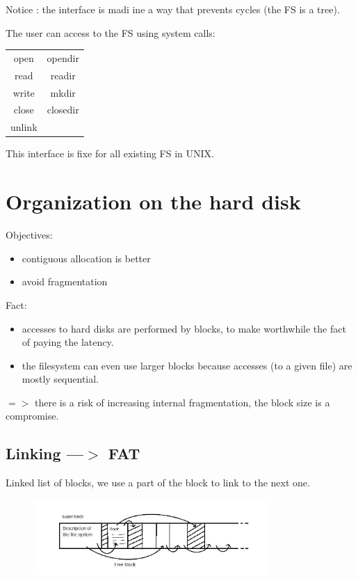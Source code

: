   Notice : the interface is madi ine a way that prevents cycles (the FS is a tree).
  
  The user can access to the FS using system calls:

    \begin{center}
      \begin{tabular}{c|c}
         open & opendir \\
         read & readir \\
         write & mkdir \\
         close & closedir \\
         unlink & \\
      \end{tabular}
    \end{center}
This interface is fixe for all existing FS in UNIX.

\section{Organization on the hard disk}

Objectives:

\begin{itemize}
  \item contiguous allocation is better
  \item avoid fragmentation
\end{itemize}

Fact:

\begin{itemize}
  \item accesses to hard disks are performed by blocks, to make worthwhile the fact of paying the latency.
  \item the filesystem can even use larger blocks because accesses (to a given file) are mostly sequential.
  
\end{itemize}

$=>$ there is a risk of increasing internal fragmentation, the block size is a compromise.

\subsection{Linking ---$>$ FAT}

Linked list of blocks, we use a part of the block to link to the next one.

 \begin{figure}[h!]
  \begin{center}
    \includegraphics[width=0.8\textwidth]{fat.jpg}
  \end{center}
\end{figure}

